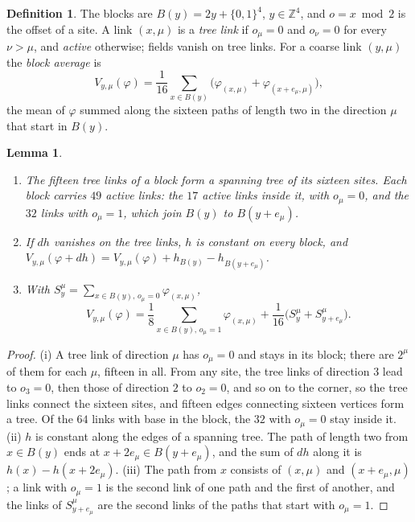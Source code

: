 \documentclass[11pt]{amsart}
\newtheorem{lemma}[theorem]{Lemma}
\theoremstyle{definition}
\newtheorem{definition}[theorem]{Definition}
\theoremstyle{remark}
\numberwithin{equation}{section}
\newcommand{\Z}{\mathbb{Z}}
\begin{document}
\begin{definition}\label{def:blockgauge}
The blocks are $B(y)=2y+\{0,1\}^4$, $y\in\Z^4$, and $o=x\bmod2$ is the offset
of a site. A link $(x,\mu)$ is a \emph{tree link} if $o_\mu=0$ and $o_\nu=0$
for every $\nu>\mu$, and \emph{active} otherwise; fields vanish on tree
links. For a coarse link $(y,\mu)$ the \emph{block average} is
\[
V_{y,\mu}(\varphi)=\frac1{16}\sum_{x\in B(y)}\bigl(\varphi_{(x,\mu)}+
\varphi_{(x+e_\mu,\mu)}\bigr),
\]
the mean of $\varphi$ summed along the sixteen paths of length two in the
direction $\mu$ that start in $B(y)$.
\end{definition}

\begin{lemma}\label{lem:blocktree}
\begin{enumerate}[label=\textup{(\roman*)},leftmargin=*]
\item The fifteen tree links of a block form a spanning tree of its sixteen
sites. Each block carries $49$ active links: the $17$ active links inside
it, with $o_\mu=0$, and the $32$ links with $o_\mu=1$, which join $B(y)$ to
$B(y+e_\mu)$.
\item If $dh$ vanishes on the tree links, $h$ is constant on every block,
and $V_{y,\mu}(\varphi+dh)=V_{y,\mu}(\varphi)+h_{B(y)}-h_{B(y+e_\mu)}$.
\item With $S^\mu_y=\sum_{x\in B(y),\,o_\mu=0}\varphi_{(x,\mu)}$,
\[
V_{y,\mu}(\varphi)=\frac18\sum_{x\in B(y),\,o_\mu=1}\varphi_{(x,\mu)}
+\frac1{16}\bigl(S^\mu_y+S^\mu_{y+e_\mu}\bigr).
\]
\end{enumerate}
\end{lemma}

\begin{proof}
(i) A tree link of direction $\mu$ has $o_\mu=0$ and stays in its block;
there are $2^\mu$ of them for each $\mu$, fifteen in all. From any site,
the tree links of direction $3$ lead to $o_3=0$, then those of direction $2$
to $o_2=0$, and so on to the corner, so the tree links connect the sixteen
sites, and fifteen edges connecting sixteen vertices form a tree. Of the
$64$ links with base in the block, the $32$ with $o_\mu=0$ stay inside it.
(ii) $h$ is constant along the edges of a spanning tree. The path of length
two from $x\in B(y)$ ends at $x+2e_\mu\in B(y+e_\mu)$, and the sum of $dh$
along it is $h(x)-h(x+2e_\mu)$. (iii) The path from $x$ consists of
$(x,\mu)$ and $(x+e_\mu,\mu)$; a link with $o_\mu=1$ is the second link of
one path and the first of another, and the links of $S^\mu_{y+e_\mu}$ are the
second links of the paths that start with $o_\mu=1$.
\end{proof}
\end{document}
